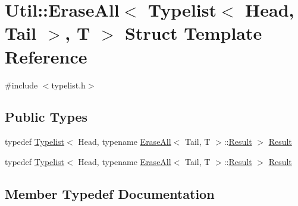 \hypertarget{structUtil_1_1TL_1_1EraseAll_3_01Typelist_3_01Head_00_01Tail_01_4_00_01T_01_4}{}\section{Util\+:\+:Erase\+All$<$ Typelist$<$ Head, Tail $>$, T $>$ Struct Template Reference}
\label{structUtil_1_1TL_1_1EraseAll_3_01Typelist_3_01Head_00_01Tail_01_4_00_01T_01_4}


{\ttfamily \#include $<$typelist.\+h$>$}

\subsection*{Public Types}
\begin{DoxyCompactItemize}
\item 
typedef \mbox{\hyperlink{structUtil_1_1Typelist}{Typelist}}$<$ Head, typename \mbox{\hyperlink{structUtil_1_1TL_1_1EraseAll}{Erase\+All}}$<$ Tail, T $>$\+::\mbox{\hyperlink{structUtil_1_1TL_1_1EraseAll_3_01Typelist_3_01Head_00_01Tail_01_4_00_01T_01_4_aa724903cc91ed9eea3da277857c8f5aa}{Result}} $>$ \mbox{\hyperlink{structUtil_1_1TL_1_1EraseAll_3_01Typelist_3_01Head_00_01Tail_01_4_00_01T_01_4_aa724903cc91ed9eea3da277857c8f5aa}{Result}}
\item 
typedef \mbox{\hyperlink{structUtil_1_1Typelist}{Typelist}}$<$ Head, typename \mbox{\hyperlink{structUtil_1_1TL_1_1EraseAll}{Erase\+All}}$<$ Tail, T $>$\+::\mbox{\hyperlink{structUtil_1_1TL_1_1EraseAll_3_01Typelist_3_01Head_00_01Tail_01_4_00_01T_01_4_aa724903cc91ed9eea3da277857c8f5aa}{Result}} $>$ \mbox{\hyperlink{structUtil_1_1TL_1_1EraseAll_3_01Typelist_3_01Head_00_01Tail_01_4_00_01T_01_4_aa724903cc91ed9eea3da277857c8f5aa}{Result}}
\end{DoxyCompactItemize}


\subsection{Member Typedef Documentation}
\mbox{\label{structUtil_1_1TL_1_1EraseAll_3_01Typelist_3_01Head_00_01Tail_01_4_00_01T_01_4_aa724903cc91ed9eea3da277857c8f5aa}} 
